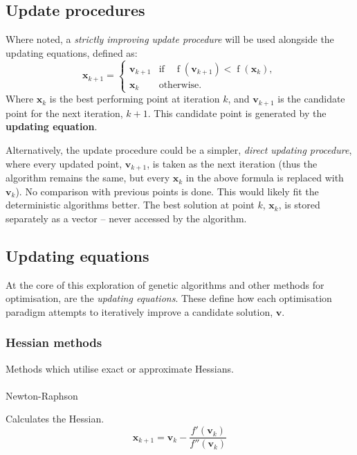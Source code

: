 \documentclass[
  a4paper,
]{article}
\makeatletter
\let\oldparagraph\paragraph
\renewcommand{\paragraph}{
    \@ifstar
      \xxxParagraphStar
      \xxxParagraphNoStar
  }
\newcommand{\xxxParagraphStar}[1]{\oldparagraph*{#1}\mbox{}}
\newcommand{\xxxParagraphNoStar}[1]{\oldparagraph{#1}\mbox{}}
\newcommand{\B}[1]{\boldsymbol{#1}}
\newcommand{\+}{\phantom{-}}
\newcommand{\op}[2]{\operatorname{#1}\left(#2\right)}
\makeatother
\begin{document}
\subsection{Update procedures}\label{update-procedures}

Where noted, a \emph{strictly improving update procedure} will be used
alongside the updating equations, defined as:
\[\B x_{k+1} = \begin{cases}\B v_{k+1}&\text{if} \quad \op{f}{\B v_{k+1}}< \op{f}{\B x_k},\\\B x_k & \text{otherwise.}\end{cases}\]
Where \(\B x_k\) is the best performing point at iteration \(k\), and
\(\B v_{k+1}\) is the candidate point for the next iteration, \(k+1\).
This candidate point is generated by the \textbf{updating equation}.

Alternatively, the update procedure could be a simpler, \emph{direct
updating procedure}, where every updated point, \(\B v_{k+1}\), is taken
as the next iteration (thus the algorithm remains the same, but every
\(\B x_k\) in the above formula is replaced with \(\B v_k\)). No
comparison with previous points is done. This would likely fit the
deterministic algorithms better. The best solution at point \(k\),
\(\B x_k\), is stored separately as a vector -- never accessed by the
algorithm.

\subsection{Updating equations}\label{updating-equations}

At the core of this exploration of genetic algorithms and other methods
for optimisation, are the \emph{updating equations}. These define how
each optimisation paradigm attempts to iteratively improve a candidate
solution, \(\B v\).

\subsubsection{Hessian methods}\label{hessian-methods}

Methods which utilise exact or approximate Hessians.

\paragraph{Newton-Raphson}\label{newton-raphson}

Calculates the Hessian.
\[\B x_{k+1} = \B v_k -\frac{f'\left(\B v_k\right)}{f''\left(\B v_k\right)}\]
\end{document}
